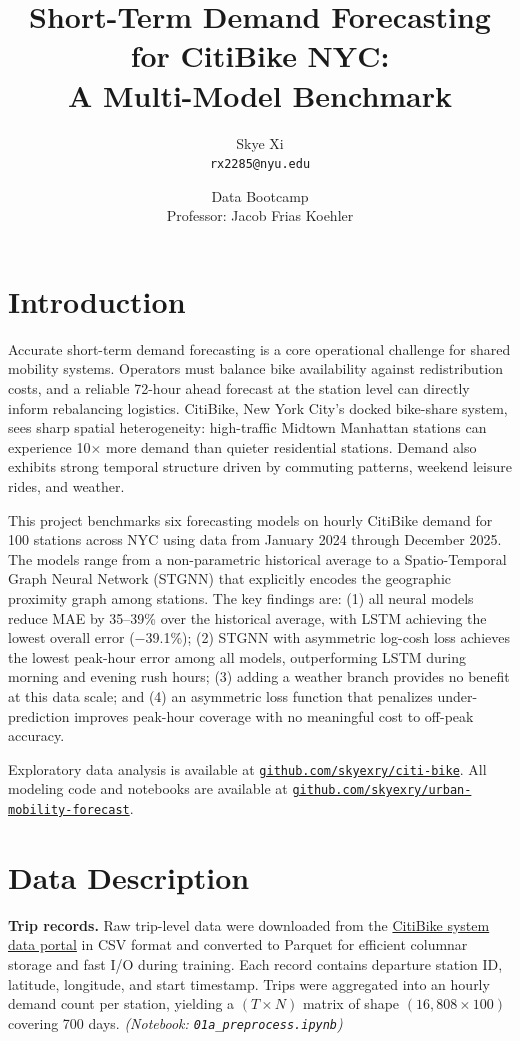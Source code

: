 \documentclass[12pt]{article}
\title{Short-Term Demand Forecasting for CitiBike NYC: \\ A Multi-Model Benchmark}
\author{Skye Xi \\ \texttt{rx2285@nyu.edu}}
\date{Data Bootcamp \\ Professor: Jacob Frias Koehler}
\begin{document}
\maketitle

\section{Introduction}

Accurate short-term demand forecasting is a core operational challenge for shared mobility
systems. Operators must balance bike availability against redistribution costs, and a reliable
72-hour ahead forecast at the station level can directly inform rebalancing logistics.
CitiBike, New York City's docked bike-share system, sees sharp spatial heterogeneity:
high-traffic Midtown Manhattan stations can experience 10$\times$ more demand than quieter
residential stations. Demand also exhibits strong temporal structure driven by commuting
patterns, weekend leisure rides, and weather.

This project benchmarks six forecasting models on hourly CitiBike demand for 100 stations
across NYC using data from January 2024 through December 2025. The models range from a
non-parametric historical average to a Spatio-Temporal Graph Neural Network (STGNN) that
explicitly encodes the geographic proximity graph among stations. The key findings are:
(1) all neural models reduce MAE by 35--39\% over the historical average, with LSTM
achieving the lowest overall error ($-$39.1\%);
(2) STGNN with asymmetric log-cosh loss achieves the lowest peak-hour error among all
models, outperforming LSTM during morning and evening rush hours;
(3) adding a weather branch provides no benefit at this data scale; and
(4) an asymmetric loss function that penalizes under-prediction improves peak-hour
coverage with no meaningful cost to off-peak accuracy.

Exploratory data analysis is available at
\href{https://github.com/skyexry/citi-bike}{\texttt{github.com/skyexry/citi-bike}}.
All modeling code and notebooks are available at
\href{https://github.com/skyexry/urban-mobility-forecast}{\texttt{github.com/skyexry/urban-mobility-forecast}}.

\section{Data Description}

\textbf{Trip records.}
Raw trip-level data were downloaded from the
\href{https://citibikenyc.com/system-data}{CitiBike system data portal} in CSV format
and converted to Parquet for efficient columnar storage and fast I/O during training.
Each record contains departure station ID, latitude, longitude, and start timestamp.
Trips were aggregated into an hourly demand count per station, yielding a
$(T \times N)$ matrix of shape $(16{,}808 \times 100)$ covering 700 days.
\textit{(Notebook: \texttt{01a\_preprocess.ipynb})}
\end{document}
